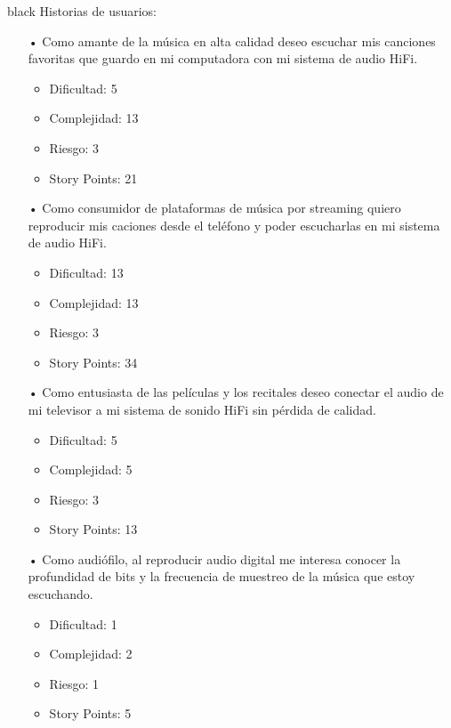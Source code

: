 \documentclass[
11pt, %
codirector, %
]{charter}
\begin{document}
\begin{consigna}{black}
Historias de usuarios:
\begin{itemize}
	\item[•] Como amante de la música en alta calidad deseo escuchar mis canciones favoritas que guardo en mi computadora con mi sistema de audio HiFi.
	\begin{itemize}
	\item Dificultad: 5
	\item Complejidad: 13
	\item Riesgo: 3
	\item Story Points: 21
	\end{itemize}
	\item[•] Como consumidor de plataformas de música por streaming quiero reproducir mis caciones desde el teléfono y poder escucharlas en mi sistema de audio HiFi.
	\begin{itemize}
	\item Dificultad: 13
	\item Complejidad: 13
	\item Riesgo: 3
	\item Story Points: 34
	\end{itemize}
	\item[•] Como entusiasta de las películas y los recitales deseo conectar el audio de mi televisor a mi sistema de sonido HiFi sin pérdida de calidad.
	\begin{itemize}
	\item Dificultad: 5
	\item Complejidad: 5
	\item Riesgo: 3
	\item Story Points: 13
	\end{itemize}
	\item[•] Como audiófilo, al reproducir audio digital me interesa conocer la profundidad de bits y la frecuencia de muestreo de la música que estoy escuchando.
	\begin{itemize}
	\item Dificultad: 1
	\item Complejidad: 2
	\item Riesgo: 1
	\item Story Points: 5
	\end{itemize}   
\end{itemize}


\end{consigna}
\end{document}
